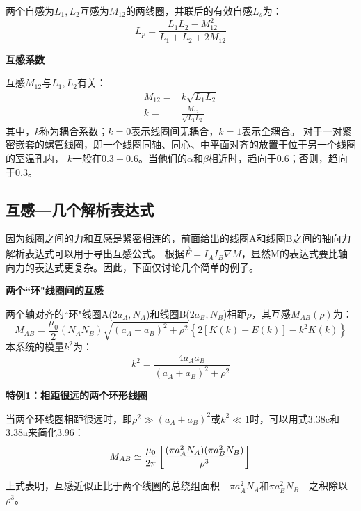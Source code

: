 两个自感为$L_1,L_2$互感为$M_{12}$的两线圈，并联后的有效自感$L_s$为：
  \begin{equation}
L_p=\frac{L_1 L_2-M_{12}^2}{L_1+L_2 \mp 2M_{12}}%
\end{equation}

\textbf{互感系数} 

互感$M_{12}$与$L_1,L_2$有关：
\begin{subequations}
	\begin{align}
M_{12}=&k\sqrt{L_1L_2}\\%
k=&\frac{M_{12}}{\sqrt{L_1L_2}}%
	\end{align}
\end{subequations}
其中，$k$称为耦合系数；$k=0$表示线圈间无耦合，$k=1$表示全耦合。
对于一对紧密嵌套的螺管线圈，即一个线圈同轴、同心、中平面对齐的放置于位于另一个线圈的室温孔内，
$k$一般在$0.3-0.6$。当他们的$\alpha$和$\beta$相近时，趋向于0.6；否则，趋向于0.3。


\subsection{互感---几个解析表达式}
因为线圈之间的力和互感是紧密相连的，前面给出的线圈A和线圈B之间的轴向力解析表达式可以用于导出互感公式。
根据$\vec{F}=I_A I_B \nabla M$，显然M的表达式要比轴向力的表达式更复杂。因此，下面仅讨论几个简单的例子。

\textbf{两个``环"线圈间的互感} 

两个轴对齐的``环"线圈A($2a_A,N_A$)和线圈B($2a_B,N_B$)相距$\rho$，其互感$M_{AB}(\rho)$为：
  \begin{equation}
M_{AB}=\frac{\mu_0}{2}(N_AN_B)\sqrt{(a_A+a_B)^2+\rho^2}\left\{2[K(k)-E(k)]-k^2K(k)\right\}%
\end{equation}
本系统的模量$k^2$为：
\begin{equation*}
k^2=\frac{4a_Aa_B}{(a_A+a_B)^2+\rho^2}%
\end{equation*}

\textbf{特例1：相距很远的两个环形线圈} 

  当两个环线圈相距很远时，即$\rho^2\gg(a_A+a_B)^2$或$k^2\ll 1$时，可以用式3.38c和3.38a来简化3.96：
\begin{equation}
M_{AB}\simeq\frac{\mu_0}{2\pi}\left[\frac{(\pi a_A^2N_A)(\pi a_B^2N_B)}{\rho^3}\right]\\%
\end{equation}

上式表明，互感近似正比于两个线圈的总绕组面积---$\pi a_A^2 N_A$和$\pi a_B^2 N_B$---之积除以$\rho^3$。

